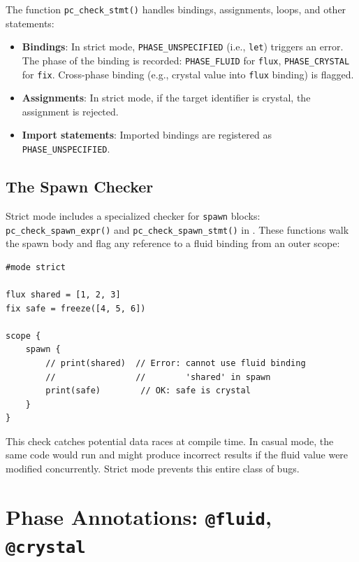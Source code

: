 The function \lstinline|pc_check_stmt()| handles bindings, assignments, loops, and other statements:

\begin{itemize}
  \item \textbf{Bindings}: In strict mode, \lstinline|PHASE_UNSPECIFIED| (i.e., \lstinline|let|) triggers an error. The phase of the binding is recorded: \lstinline|PHASE_FLUID| for \lstinline|flux|, \lstinline|PHASE_CRYSTAL| for \lstinline|fix|. Cross-phase binding (e.g., crystal value into \lstinline|flux| binding) is flagged.

  \item \textbf{Assignments}: In strict mode, if the target identifier is crystal, the assignment is rejected.

  \item \textbf{Import statements}: Imported bindings are registered as \lstinline|PHASE_UNSPECIFIED|.
\end{itemize}

\subsection{The Spawn Checker}


Strict mode includes a specialized checker for \lstinline|spawn| blocks: \lstinline|pc_check_spawn_expr()| and \lstinline|pc_check_spawn_stmt()| in .
These functions walk the spawn body and flag any reference to a fluid binding from an outer scope:

\begin{lstlisting}[language=Lattice, caption={The spawn checker in action}]
#mode strict

flux shared = [1, 2, 3]
fix safe = freeze([4, 5, 6])

scope {
    spawn {
        // print(shared)  // Error: cannot use fluid binding
        //                //        'shared' in spawn
        print(safe)        // OK: safe is crystal
    }
}
\end{lstlisting}

This check catches potential data races at compile time.
In casual mode, the same code would run and might produce incorrect results if the fluid value were modified concurrently.
Strict mode prevents this entire class of bugs.

\section{Phase Annotations: \texttt{@fluid}, \texttt{@crystal}}\label{sec:phase-annotations}

